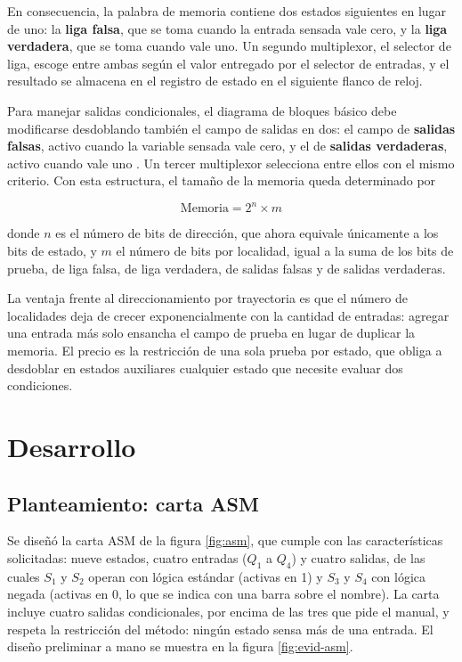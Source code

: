 En consecuencia, la palabra de memoria contiene dos estados siguientes en lugar de uno: la
\textbf{liga falsa}, que se toma cuando la entrada sensada vale cero, y la \textbf{liga
verdadera}, que se toma cuando vale uno. Un segundo multiplexor, el selector de liga,
escoge entre ambas según el valor entregado por el selector de entradas, y el resultado se
almacena en el registro de estado en el siguiente flanco de reloj.

Para manejar salidas condicionales, el diagrama de bloques básico debe modificarse
desdoblando también el campo de salidas en dos: el campo de \textbf{salidas falsas},
activo cuando la variable sensada vale cero, y el de \textbf{salidas verdaderas}, activo
cuando vale uno \cite{savage}. Un tercer multiplexor selecciona entre ellos con el mismo
criterio. Con esta estructura, el tamaño de la memoria queda determinado por

\begin{equation}
\text{Memoria} = 2^{n} \times m
\label{eq:tam}
\end{equation}

donde $n$ es el número de bits de dirección, que ahora equivale únicamente a los bits de
estado, y $m$ el número de bits por localidad, igual a la suma de los bits de prueba, de
liga falsa, de liga verdadera, de salidas falsas y de salidas verdaderas.

La ventaja frente al direccionamiento por trayectoria es que el número de localidades deja
de crecer exponencialmente con la cantidad de entradas: agregar una entrada más solo
ensancha el campo de prueba en lugar de duplicar la memoria. El precio es la restricción
de una sola prueba por estado, que obliga a desdoblar en estados auxiliares cualquier
estado que necesite evaluar dos condiciones.

\section{Desarrollo}

\subsection{Planteamiento: carta ASM}

Se diseñó la carta ASM de la figura \ref{fig:asm}, que cumple con las características
solicitadas: nueve estados, cuatro entradas ($Q_1$ a $Q_4$) y cuatro salidas, de las
cuales $S_1$ y $S_2$ operan con lógica estándar (activas en 1) y $S_3$ y $S_4$ con lógica
negada (activas en 0, lo que se indica con una barra sobre el nombre). La carta incluye
cuatro salidas condicionales, por encima de las tres que pide el manual, y respeta la
restricción del método: ningún estado sensa más de una entrada. El diseño preliminar a
mano se muestra en la figura \ref{fig:evid-asm}.

